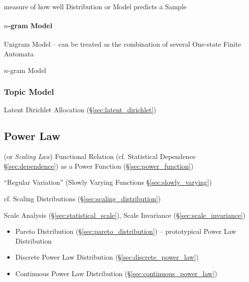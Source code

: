 measure of how well Distribution or Model predicts a Sample




\paragraph{$n$-gram Model}\label{sec:ngram_model}\hfill

Unigram Model -- can be treated as the combination of several One-state Finite
Automata

$n$-gram Model



\subsubsection{Topic Model}\label{sec:topic_model}

Latent Dirichlet Allocation (\S\ref{sec:latent_dirichlet})



\subsection{Power Law}\label{sec:power_law}

(or \emph{Scaling Law}) Functional Relation (cf.
Statistical Dependence \S\ref{sec:dependence}) as a Power Function
(\S\ref{sec:power_function})

``Regular Variation'' (Slowly Varying Functions \S\ref{sec:slowly_varying})

cf. Scaling Distributions (\S\ref{sec:scaling_distribution})


Scale Analysis (\S\ref{sec:statistical_scale}), Scale Invariance
(\S\ref{sec:scale_invariance})

\begin{itemize}
  \item Pareto Distribution (\S\ref{sec:pareto_distribution}) -- prototypical
    Power Law Distribution
  \item Discrete Power Law Distribution (\S\ref{sec:discrete_power_law})
  \item Continuous Power Law Distribution (\S\ref{sec:continuous_power_law})
\end{itemize}

